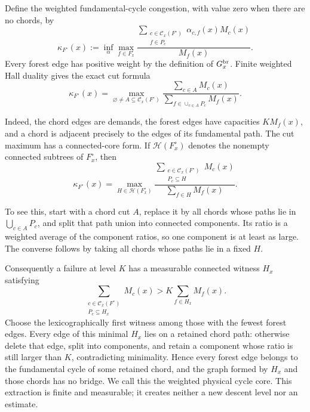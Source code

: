 \documentclass[11pt]{article}
\begin{document}
Define the weighted fundamental-cycle congestion, with value zero when there
are no chords, by
\begin{equation}\label{eq:weighted-fundamental-cycle-congestion}
 \boxed{
 \kappa_{F^\circ}(x):=
 \inf_\alpha\max_{f\in F_x^\circ}
 \frac{\displaystyle
       \sum_{\substack{c\in\mathcal C_x(F^\circ)\\f\in P_c}}
       \alpha_{c,f}(x)M_c(x)}
      {M_f(x)}.}
\end{equation}
Every forest edge has positive weight by the definition of
\(G_x^{\rm br}\).  Finite weighted Hall duality gives the exact cut formula
\begin{equation}\label{eq:fundamental-cycle-congestion-cuts}
 \boxed{
 \kappa_{F^\circ}(x)
 =
 \max_{\varnothing\ne A\subseteq\mathcal C_x(F^\circ)}
 \frac{\displaystyle\sum_{c\in A}M_c(x)}
      {\displaystyle\sum_{f\in\cup_{c\in A}P_c}M_f(x)}.}
\end{equation}

Indeed, the chord edges are demands, the forest edges have capacities
\(K M_f(x)\), and a chord is adjacent precisely to the edges of its
fundamental path.  The cut maximum has a connected-core form.  If
\(\mathscr H(F_x^\circ)\) denotes the nonempty connected subtrees of
\(F_x^\circ\), then
\begin{equation}\label{eq:fundamental-cycle-connected-core}
 \boxed{
 \kappa_{F^\circ}(x)
 =
 \max_{H\in\mathscr H(F_x^\circ)}
 \frac{\displaystyle
       \sum_{\substack{c\in\mathcal C_x(F^\circ)\\P_c\subseteq H}}M_c(x)}
      {\displaystyle\sum_{f\in H}M_f(x)}.}
\end{equation}

To see this, start with a chord cut \(A\), replace it by all chords whose
paths lie in \(\bigcup_{c\in A}P_c\), and split that path union into connected
components.  Its ratio is a weighted average of the component ratios, so one
component is at least as large.  The converse follows by taking all chords
whose paths lie in a fixed \(H\).

Consequently a failure at level \(K\) has a measurable connected witness
\(H_x\) satisfying
\begin{equation}\label{eq:dense-cycle-core-witness}
 \sum_{\substack{c\in\mathcal C_x(F^\circ)\\P_c\subseteq H_x}}M_c(x)
 >
 K\sum_{f\in H_x}M_f(x).
\end{equation}
Choose the lexicographically first witness among those with the fewest forest
edges.  Every edge of this minimal \(H_x\) lies on a retained chord path:
otherwise delete that edge, split into components, and retain a component
whose ratio is still larger than \(K\), contradicting minimality.  Hence every
forest edge belongs to the fundamental cycle of some retained chord, and the
graph formed by \(H_x\) and those chords has no bridge.  We call this the
weighted physical cycle core.  This extraction is finite and measurable; it
creates neither a new descent level nor an estimate.
\end{document}
